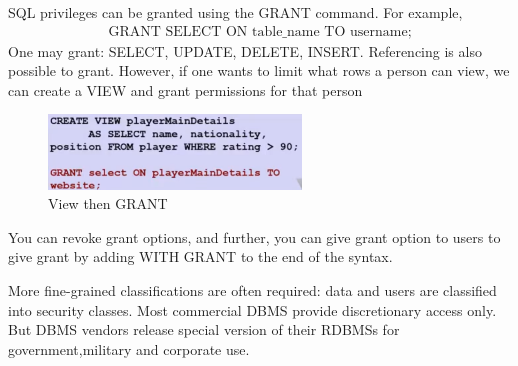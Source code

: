 \documentclass[a4paper]{article}
\theoremstyle{plain}
\theoremstyle{definition}
\newtheorem{defn}{Definition}[section]
\theoremstyle{remark}
\begin{document}
\begin{tcolorbox}[colback=black!3!white,colframe=black!60!white,title=\begin{defn}GRANT \label{GRANT}\end{defn}]
SQL privileges can be granted using the GRANT command. For example,
\begin{align}
\text{GRANT SELECT ON table$\_$name TO username;}
\end{align}
One may grant: SELECT, UPDATE, DELETE, INSERT. Referencing is also possible to grant. However, if one wants to limit what rows a person can view, we can create a VIEW and grant permissions for that person
\begin{figure}[H]
	\centering
	\includegraphics[width=0.6\textwidth]{one.png}
	\caption{View then GRANT}
	\label{fig:}
\end{figure}
You can revoke grant options, and further, you can give grant option to users to give grant by adding WITH GRANT to the end of the syntax.
\end{tcolorbox} 
\begin{tcolorbox}[colback=black!3!white,colframe=black!60!white,title=\begin{defn}Mandatory Access Control \label{Mandatory Access Control}\end{defn}]
More fine-grained classifications are often required: data and users are classified into security classes. Most commercial DBMS provide discretionary access only. But DBMS vendors release special version of their RDBMSs for government,military and corporate use. 
\end{tcolorbox}
\end{document}
